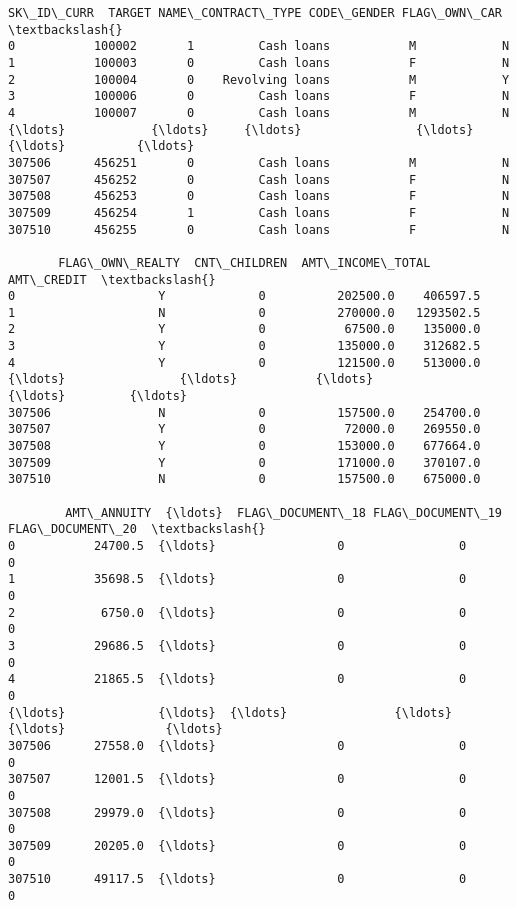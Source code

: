 \documentclass[11pt]{article}
\makeatletter
\newcommand{\boxspacing}{\kern\kvtcb@left@rule\kern\kvtcb@boxsep}
\newcommand{\prompt}[4]{
        {\ttfamily\llap{{\color{#2}[#3]:\hspace{3pt}#4}}\vspace{-\baselineskip}}
    }
\makeatother
\begin{document}
            \begin{tcolorbox}[breakable, size=fbox, boxrule=.5pt, pad at break*=1mm, opacityfill=0]
\prompt{Out}{outcolor}{2}{\boxspacing}
\begin{Verbatim}[commandchars=\\\{\}]
        SK\_ID\_CURR  TARGET NAME\_CONTRACT\_TYPE CODE\_GENDER FLAG\_OWN\_CAR  \textbackslash{}
0           100002       1         Cash loans           M            N
1           100003       0         Cash loans           F            N
2           100004       0    Revolving loans           M            Y
3           100006       0         Cash loans           F            N
4           100007       0         Cash loans           M            N
{\ldots}            {\ldots}     {\ldots}                {\ldots}         {\ldots}          {\ldots}
307506      456251       0         Cash loans           M            N
307507      456252       0         Cash loans           F            N
307508      456253       0         Cash loans           F            N
307509      456254       1         Cash loans           F            N
307510      456255       0         Cash loans           F            N

       FLAG\_OWN\_REALTY  CNT\_CHILDREN  AMT\_INCOME\_TOTAL  AMT\_CREDIT  \textbackslash{}
0                    Y             0          202500.0    406597.5
1                    N             0          270000.0   1293502.5
2                    Y             0           67500.0    135000.0
3                    Y             0          135000.0    312682.5
4                    Y             0          121500.0    513000.0
{\ldots}                {\ldots}           {\ldots}               {\ldots}         {\ldots}
307506               N             0          157500.0    254700.0
307507               Y             0           72000.0    269550.0
307508               Y             0          153000.0    677664.0
307509               Y             0          171000.0    370107.0
307510               N             0          157500.0    675000.0

        AMT\_ANNUITY  {\ldots}  FLAG\_DOCUMENT\_18 FLAG\_DOCUMENT\_19 FLAG\_DOCUMENT\_20  \textbackslash{}
0           24700.5  {\ldots}                 0                0                0
1           35698.5  {\ldots}                 0                0                0
2            6750.0  {\ldots}                 0                0                0
3           29686.5  {\ldots}                 0                0                0
4           21865.5  {\ldots}                 0                0                0
{\ldots}             {\ldots}  {\ldots}               {\ldots}              {\ldots}              {\ldots}
307506      27558.0  {\ldots}                 0                0                0
307507      12001.5  {\ldots}                 0                0                0
307508      29979.0  {\ldots}                 0                0                0
307509      20205.0  {\ldots}                 0                0                0
307510      49117.5  {\ldots}                 0                0                0


\end{Verbatim}
\end{tcolorbox}
\end{document}

